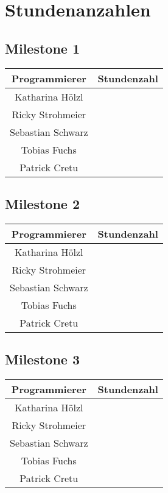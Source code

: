 \chapter{Stundenanzahlen}
\section{Milestone 1}
\begin{center}
	\begin{tabular}{|c|c|}
		\hline \textbf{Programmierer} & \textbf{Stundenzahl} \\ 
		\hline Katharina Hölzl  &  \\ 
		\hline Ricky Strohmeier &  \\ 
		\hline Sebastian Schwarz &  \\ 
		\hline Tobias Fuchs &  \\ 
		\hline Patrick Cretu &  \\ 
		\hline 
	\end{tabular}
\end{center} 
\section{Milestone 2}
\begin{center}
	\begin{tabular}{|c|c|}
		\hline \textbf{Programmierer} & \textbf{Stundenzahl} \\ 
		\hline Katharina Hölzl  &  \\ 
		\hline Ricky Strohmeier &  \\ 
		\hline Sebastian Schwarz &  \\ 
		\hline Tobias Fuchs &  \\ 
		\hline Patrick Cretu &  \\ 
		\hline 
	\end{tabular}
\end{center} 
\section{Milestone 3}
\begin{center}
	\begin{tabular}{|c|c|}
		\hline \textbf{Programmierer} & \textbf{Stundenzahl} \\ 
		\hline Katharina Hölzl  &  \\ 
		\hline Ricky Strohmeier &  \\ 
		\hline Sebastian Schwarz &  \\ 
		\hline Tobias Fuchs &  \\ 
		\hline Patrick Cretu &  \\ 
		\hline 
	\end{tabular}
\end{center} 
